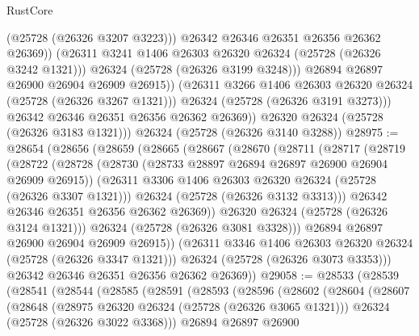 \begin{lexlean}{RustCore}
\begin{coremodule}
                        (@25728 (@26326 @3207 @3223)))
                      @26342
                      @26346
                      @26351
                      @26356
                      @26362
                      @26369))
                  (@26311 @3241 @1406 @26303 @26320 @26324 (@25728 (@26326 @3242 @1321)))
                  @26324
                  (@25728 (@26326 @3199 @3248)))
                @26894
                @26897
                @26900
                @26904
                @26909
                @26915))
            (@26311 @3266 @1406 @26303 @26320 @26324 (@25728 (@26326 @3267 @1321)))
            @26324
            (@25728 (@26326 @3191 @3273)))
          @26342
          @26346
          @26351
          @26356
          @26362
          @26369))
      @26320
      @26324
      (@25728 (@26326 @3183 @1321)))
    @26324
    (@25728 (@26326 @3140 @3288))
@28975 := @28654
    (@28656
      (@28659
        (@28665
          (@28667
            (@28670
              (@28711
                (@28717
                  (@28719
                    (@28722
                      (@28728
                        (@28730 (@28733 @28897 @26894 @26897 @26900 @26904 @26909 @26915))
                        (@26311 @3306 @1406 @26303 @26320 @26324 (@25728 (@26326 @3307 @1321)))
                        @26324
                        (@25728 (@26326 @3132 @3313)))
                      @26342
                      @26346
                      @26351
                      @26356
                      @26362
                      @26369))
                  @26320
                  @26324
                  (@25728 (@26326 @3124 @1321)))
                @26324
                (@25728 (@26326 @3081 @3328)))
              @26894
              @26897
              @26900
              @26904
              @26909
              @26915))
          (@26311 @3346 @1406 @26303 @26320 @26324 (@25728 (@26326 @3347 @1321)))
          @26324
          (@25728 (@26326 @3073 @3353)))
        @26342
        @26346
        @26351
        @26356
        @26362
        @26369))
@29058 := @28533
    (@28539
      (@28541
        (@28544
          (@28585
            (@28591
              (@28593
                (@28596
                  (@28602
                    (@28604
                      (@28607
                        (@28648
                          (@28975 @26320 @26324 (@25728 (@26326 @3065 @1321)))
                          @26324
                          (@25728 (@26326 @3022 @3368)))
                        @26894
                        @26897
                        @26900

\end{coremodule}
\end{lexlean}
